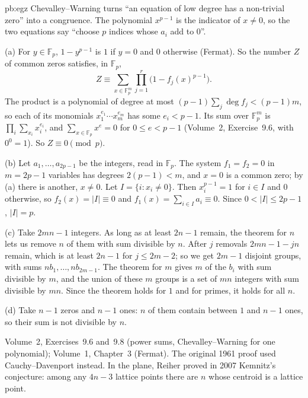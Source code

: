 \begin{solution}{pb:egz}
\idea Chevalley--Warning turns ``an equation of low degree has a non-trivial zero'' into a congruence. The polynomial $x^{p-1}$
is the indicator of $x\ne0$, so the two equations say ``choose $p$ indices whose $a_i$ add to $0$''.

\writeup (a) For $y\in\mathbb F_p$, $1-y^{p-1}$ is $1$ if $y=0$ and $0$ otherwise (Fermat). So the number $Z$ of common zeros
satisfies, in $\mathbb F_p$,
\[
Z\equiv\sum_{x\in\mathbb F_p^m}\prod_{j=1}^r\bigl(1-f_j(x)^{p-1}\bigr).
\]
The product is a polynomial of degree at most $(p-1)\sum_j\deg f_j<(p-1)m$, so each of its monomials $x_1^{e_1}\cdots x_m^{e_m}$ has
some $e_i<p-1$. Its sum over $\mathbb F_p^m$ is $\prod_i\sum_{x_i}x_i^{e_i}$, and $\sum_{x\in\mathbb F_p}x^e=0$ for $0\le e<p-1$
(Volume~2, Exercise~9.6, with $0^0=1$). So $Z\equiv0\pmod p$.

(b) Let $a_1,\dots,a_{2p-1}$ be the integers, read in $\mathbb F_p$. The system $f_1=f_2=0$ in $m=2p-1$ variables has degrees
$2(p-1)<m$, and $x=0$ is a common zero; by (a) there is another, $x\ne0$. Let $I=\{i:x_i\ne0\}$. Then $x_i^{p-1}=1$ for $i\in I$ and
$0$ otherwise, so $f_2(x)=|I|\equiv0$ and $f_1(x)=\sum_{i\in I}a_i\equiv0$. Since $0<|I|\le2p-1$, $|I|=p$.

(c) Take $2mn-1$ integers. As long as at least $2n-1$ remain, the theorem for $n$ lets us remove $n$ of them with sum divisible by
$n$. After $j$ removals $2mn-1-jn$ remain, which is at least $2n-1$ for $j\le2m-2$; so we get $2m-1$ disjoint groups, with sums
$nb_1,\dots,nb_{2m-1}$. The theorem for $m$ gives $m$ of the $b_i$ with sum divisible by $m$, and the union of these $m$ groups is a
set of $mn$ integers with sum divisible by $mn$. Since the theorem holds for $1$ and for primes, it holds for all $n$.

(d) Take $n-1$ zeros and $n-1$ ones: $n$ of them contain between $1$ and $n-1$ ones, so their sum is not divisible by $n$.

\tools Volume~2, Exercises~9.6 and~9.8 (power sums, Chevalley--Warning for one polynomial); Volume~1, Chapter~3 (Fermat).
\leads The original 1961 proof used Cauchy--Davenport instead. In the plane, Reiher proved in 2007 Kemnitz's conjecture: among
any $4n-3$ lattice points there are $n$ whose centroid is a lattice point.
\end{solution}

